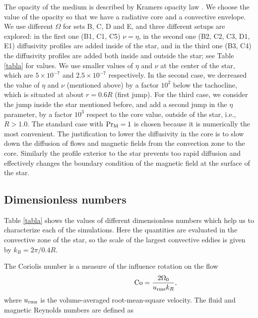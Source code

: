 \documentclass[baaa]{baaa}
\begin{document}
The opacity of the medium is described by Kramers opacity law \citep{kramerley}. We choose the value of the opacity so that we have a radiative core and a convective envelope. We use different $\Omega$ for sets B, C, D and E, and three different setups are explored: in the first one (B1, C1, C5) $\nu = \eta$, in the second one (B2, C2, C3, D1, E1) diffusivity profiles are added inside of the star, and in the third one (B3, C4) the diffusivity profiles are added both inside and outside the star; see Table \ref{tabla} for values.
We use 
smaller values of $\eta$ and $\nu$ at the center of the star, which are $5\times 10^{-7}$ and $2.5\times 10^{-7}$ respectively. In the second case, we decreased the value of $\eta$ and $\nu$ (mentioned above) by a factor $10^{2}$ below the tachocline, which is situated at about $r = 0.6 R$ (first jump). For the third case, we consider the jump inside the star mentioned before, and add a second jump in the $\eta$ parameter, by a factor $10^{3}$ respect to the core value, outside of the star, i.e., $R > 1.0$. 
The standard case with ${\rm Pr}_{\rm M} =1$ is chosen because it is numerically the most convenient. The justification to lower the diffusivity in the core is to slow down the diffusion of flows and magnetic fields from the convection zone to the core. Similarly the profile exterior to the star prevents too rapid diffusion and effectively changes the boundary condition of the magnetic field at the surface of the star.


\subsection{Dimensionless numbers}

Table \ref{tabla} shows the values of different dimensionless numbers which help us to characterize each of the simulations. Here the quantities are evaluated in the convective zone of the star, so the scale of the largest convective eddies is given by $k_R = 2\pi/0.4R$.

The Coriolis number is a measure of the influence rotation on the flow
\begin{equation}
    \;\;\;\;\;\;\;\;\;\;\;\;\;\;\;\;\;\;\;\;\;\;\;\;\;\;\;\;{\rm Co} = \frac{2\Omega_0}{u_{\rm rms} k_{R}},
\end{equation}
where $u_{\rm rms}$ is the volume-averaged root-mean-square velocity. The fluid and magnetic Reynolds numbers are defined as
\end{document}
